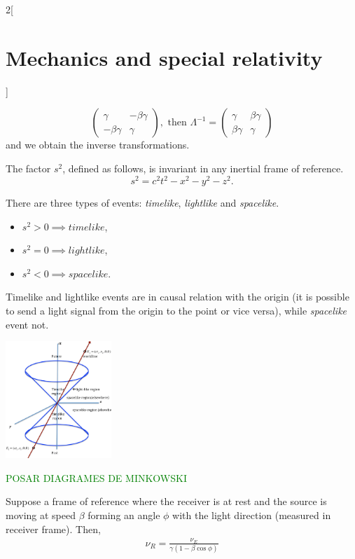 \documentclass[../../../main.tex]{subfiles}
\begin{document}
\begin{multicols}{2}[\section{Mechanics and special relativity}]
\begin{concept}
$$\begin{pmatrix}
\gamma & -\beta\gamma\\
-\beta\gamma & \gamma
\end{pmatrix},\text{ then }\Lambda^{-1}=\begin{pmatrix}
\gamma & \beta\gamma\\
\beta\gamma & \gamma
\end{pmatrix}$$ and we obtain the inverse transformations.
\end{concept}
\begin{concept}
The factor $s^2$, defined as follows, is invariant in any inertial frame of reference. $$s^2=c^2t^2-x^2-y^2-z^2.$$
\end{concept}
\begin{concept}
There are three types of events: \textit{timelike}, \textit{lightlike} and \textit{spacelike}.
\begin{itemize}
    \item $s^2>0\implies timelike$,
    \item $s^2=0\implies lightlike$,
    \item $s^2<0\implies spacelike$.
\end{itemize}
Timelike and lightlike events are in causal relation with the origin (it is possible to send a light signal from the origin to the point or vice versa), while \textit{spacelike} event not.
\end{concept}
\begin{minipage}{\linewidth}
    \centering
    \includegraphics[width=4cm]{Physics/1st/Mechanics_and_special_relativity/Images/mink.png}
\end{minipage}
\textcolor{green}{POSAR DIAGRAMES DE MINKOWSKI}
\begin{concept}
Suppose a frame of reference where the receiver is at rest and the source is moving at speed $\beta$ forming an angle $\phi$ with the light direction (measured in receiver frame). Then, 
\begin{gather}
    \label{dopp1}\nu_R=\frac{\nu_E}{\gamma(1-\beta\cos\phi)}\\

\end{gather}
\end{concept}
\end{multicols}
\end{document}
